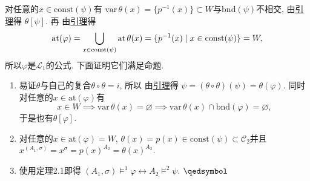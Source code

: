 \documentclass[UTF8]{ctexart}
\begin{document}
对任意的$x\in\mathrm{const}(\psi)$有
$\mathrm{var}\,\theta(x)=\{p^{-1}(x)\}\subset W$与$\mathrm{bnd}(\psi)$不相交,
由\href{../../01 一阶语言/05 单点替换#nameddest=sec:定理1.6}{引理}得
$\theta[\psi]$. 再
由\href{../../01 一阶语言/04 一般替换#nameddest=sec:定理3.2}{引理}得
\[
    \mathrm{at}(\varphi)=
    \bigcup_{x\in\mathrm{const}(\psi)}\mathrm{at}\,\theta(x)=
    \{p^{-1}(x)\mid x\in\mathrm{const}(\psi)\}=W,\\[3pt]
\]
所以$\varphi$是$\mathcal{L}_1$的公式. 下面证明它们满足命题.

\begin{enumerate}
    \item 易证$\theta$与自己的复合$\theta\circ\theta=i$, 所以
    由\href{../../01 一阶语言/04 一般替换#nameddest=sec:定理4.2}{引理}得
    $\psi=(\theta\circ\theta)(\psi)=\theta(\varphi)$.
    同时对任意的$x\in\mathrm{at}(\varphi)$有
    \[
        x\in W\implies\mathrm{var}\,\theta(x)=\varnothing\implies
        \mathrm{var}\,\theta(x)\cap\mathrm{bnd}(\varphi)=\varnothing,
    \]
    于是也有$\theta[\varphi]$.
    \item 对任意的$x\in\mathrm{at}(\varphi)=W$,
    $\theta(x)=p(x)\in\mathrm{const}(\psi)\subset\mathcal{C}_2$并且
    $x^{(A_1,\sigma)}=x^\sigma=p(x)^{A_2}=\theta(x)^{A_2}$.
    \item 使用定理2.1即得
    $(A_1,\sigma)\models^1\varphi\leftrightarrow A_2\models^2\psi$.
    \hfill $\qedsymbol$
\end{enumerate}
\end{document}
